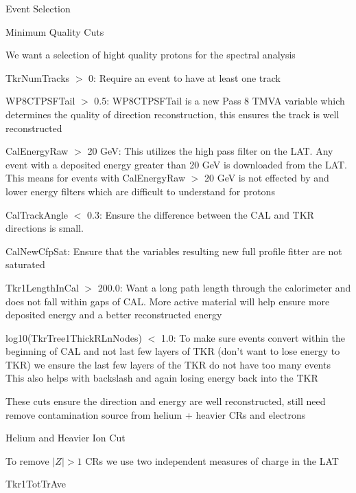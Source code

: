 \documentclass{article}
\begin{document}
\begin{myEnumerate}
\begin{myEnumerate}
			\end{myEnumerate}
		\item Event Selection
			\begin{myEnumerate}
				\item Minimum Quality Cuts
				\begin{myEnumerate}
					\item We want a selection of hight quality protons for the spectral analysis
					\item TkrNumTracks $>$ 0: Require an event to have at least one track
					\item WP8CTPSFTail $>$ 0.5: WP8CTPSFTail is a new Pass 8 TMVA variable which determines the quality of direction reconstruction, this ensures the track is well reconstructed
					\item CalEnergyRaw $>$ 20 GeV: This utilizes the high pass filter on the LAT.  Any event with a deposited energy greater than 20 GeV is downloaded from the LAT.  This means for events with CalEnergyRaw $>$ 20 GeV is not effected by and lower energy filters which are difficult to understand for protons
					\item CalTrackAngle $<$ 0.3: Ensure the difference between the CAL and TKR directions is small.
					\item CalNewCfpSat: Ensure that the variables resulting new full profile fitter are not saturated
					\item Tkr1LengthInCal $>$ 200.0: Want a long path length through the calorimeter and does not fall within gaps of CAL.  More active material will help ensure more deposited energy and a better reconstructed energy
					\item log10(TkrTree1ThickRLnNodes) $<$ 1.0: To make sure events convert within the beginning of CAL and not last few layers of TKR (don't want to lose energy to TKR) we ensure the last few layers of the TKR do not have too many events  This also helps with backslash and again losing energy back into the TKR
					\item These cuts ensure the direction and energy are well reconstructed, still need remove contamination source from helium + heavier CRs and electrons
				\end{myEnumerate}
				\item Helium and Heavier Ion Cut
				\begin{myEnumerate}
					\item To remove $|Z| > 1$ CRs we use two independent measures of charge in the LAT
					\item Tkr1TotTrAve

\end{myEnumerate}
\end{myEnumerate}
\end{myEnumerate}
\end{document}
